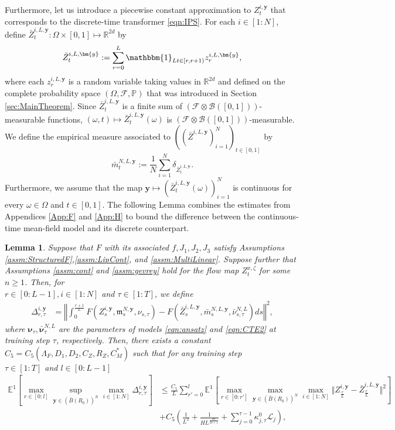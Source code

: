 \documentclass{article}
\newtheorem{lemma}[theorem]{Lemma}
\newcommand{\R}{\mathbb{R}}
\begin{document}
\begin{appendices}
Furthermore, let us introduce a piecewise constant approximation to $Z^{i,\bm{y}}_t$ that corresponds to the discrete-time transformer \eqref{eqn:IPS}. For each $i\in[1:N]$, define $\bar Z_t^{i,L,\bm{y}}:\Omega\times [0,1]\mapsto \R^{2d}$ by 
\[
\bar Z^{i,L,\bm{y}}_t := \sum_{r=0}^L\mathbbm{1}_{Lt\in[r,r+1)}z^{i,L,\bm{y}}_r,
\]
where each $z^{i,L,\bm{y}}_r$ is a random variable taking values in $\R^{2d}$ and defined on the complete probability space $(\Omega,\mathcal F,\mathbb P)$ that was introduced in Section \ref{sec:MainTheorem}. Since $\bar Z^{i,L,\bm{y}}_t$ is a finite sum of $(\mathcal F \otimes \mathcal B([0,1]))$-measurable functions, $(\omega,t)\mapsto \bar Z^{i,L,\bm{y}}_t(\omega)$ is  $(\mathcal F\otimes \mathcal B([0,1]))$-measurable. We define the empirical measure associated to $((\bar Z^{i,L,\bm{y}})_{i=1}^N)_{t\in[0,1]}$ by
\[
\bar m^{N,L,\bm{y}}_t:= \frac{1}{N}\sum_{i=1}^N\delta_{\bar Z^{i,L,\bm{y}}_t}.
\]
Furthermore, we assume that the map $\bm{y}\mapsto (\bar Z^{i,L,\bm{y}}_t(\omega))_{i=1}^N$ is continuous for every $\omega\in \Omega$ and $t\in[0,1]$.
The following Lemma combines the estimates from Appendices \ref{App:F} and \ref{App:H} to bound the difference between the continuous-time mean-field model and its discrete counterpart. 
\begin{lemma}\label{lemma:StochasticApprox}
Suppose that $F$ with its associated $f,J_1,J_2,J_3$ satisfy Assumptions \ref{assm:StructuredF},\ref{assm:LipCont}, and \ref{assm:MultiLinear}. Suppose further that Assumptions \ref{assm:cont} and \ref{assm:gevrey} hold for the flow map $Z^{x,\zeta}_t$ for some $n \ge 1$. Then, for \\$r\in[0:L-1],i\in[1:N]$ and $ \tau \in [1:T]$, we define 
\begin{align}\label{eqn:Delta_r'_i}
\Delta_{r,\tau}^{i,\bm{y}} &= \left\Vert \int_0^\frac{r+1}{L}F(Z^{i,\bm{y}}_s,\mathfrak{m}^{N,\bm{y}}_s,\nu_{s,\tau})-F(\bar Z^{i,L,\bm{y}}_s,\bar m^{N,L,\bm{y}}_s,\bar\nu^{N,L}_{s,\tau})ds\right\Vert^2,
\end{align}
where $\bm\nu_\tau,\bm{\bar \nu}^{N,L}_\tau$ are the parameters of models \eqref{eqn:ansatz} and \eqref{eqn:CTE2} at training step $\tau$, respectively. 
Then, there exists a constant $C_5=C_5(\Lambda_F,D_1,D_2,C_Z,R_Z, C^*_M)$ such that for any training step \\$\tau \in [1: T]$ and $l \in [0:L-1]$
\begin{align*}
    \mathbb E^1\left[\max_{r\in[0:l]}\sup_{\bm{y}\in (\bar B(R_0))^N}\max_{i\in[1:N]} \Delta_{r,\tau}^{i,\bm{y}} \right] &\le \frac{C_5}{L}\sum_{r'=0}^l\mathbb E^1\left[\max_{ r \in[0:r']}\max_{\bm{y}\in (\bar B(R_0))^N}\max_{i \in[1:N]} \Vert Z^{i,\bm{y}}_{\frac{r}{L}}-\bar Z^{i,L,\bm{y}}_{\frac{r}{L}}\Vert^2\right]\\&+ C_5\left(\frac{1}{L^2}+\frac{1}{HL^{\frac{2n}{2n+1}}}+\sum_{j=0}^{\tau-1}\kappa^0_{j,\tau}\mathscr{L}_j\right),

\end{align*}
\end{lemma}
\end{appendices}
\end{document}
